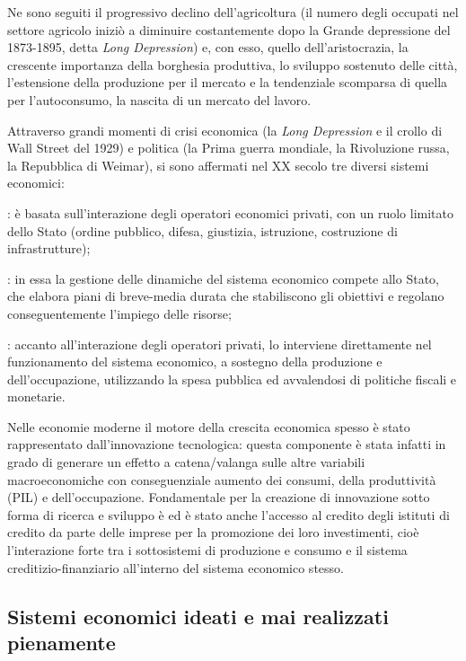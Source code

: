 Ne sono seguiti il progressivo declino dell'agricoltura (il numero degli 
occupati nel settore agricolo iniziò a diminuire costantemente dopo la Grande 
depressione del 1873-1895, detta \emph{Long Depression}) e, con esso, quello 
dell'aristocrazia, la crescente importanza della borghesia produttiva, lo 
sviluppo sostenuto delle città, l'estensione della produzione per il mercato e 
la tendenziale scomparsa di quella per l'autoconsumo, la nascita di un mercato 
del lavoro.

Attraverso grandi momenti di crisi economica (la \emph{Long Depression} e il 
crollo di Wall Street del 1929) e politica (la 
Prima guerra mondiale, la Rivoluzione russa, la Repubblica di 
Weimar), si sono affermati nel XX secolo tre diversi sistemi economici:
\begin{description} [noitemsep]
\item [l'economia di mercato]: è basata sull'interazione degli operatori 
economici privati, con un ruolo limitato dello Stato (ordine pubblico, 
difesa, giustizia, istruzione, costruzione di infrastrutture);
\item [l'economia pianificata]: in essa la gestione delle dinamiche del sistema 
economico compete allo Stato, che elabora piani di breve-media durata che 
stabiliscono gli obiettivi e regolano conseguentemente l'impiego delle risorse;
\item [l'economia mista]: accanto all'interazione degli operatori privati, lo 
interviene direttamente nel funzionamento del sistema economico, a sostegno 
della produzione e dell'occupazione, utilizzando la spesa pubblica ed 
avvalendosi di politiche fiscali e monetarie.
\end{description}

Nelle economie moderne il motore della crescita economica spesso è stato 
rappresentato dall'innovazione tecnologica: questa componente è stata infatti in 
grado di generare un effetto a catena/valanga sulle altre variabili 
macroeconomiche con conseguenziale aumento dei consumi, della produttività (PIL) 
e dell'occupazione. 
Fondamentale per la creazione di innovazione sotto forma di ricerca e 
sviluppo è ed è stato anche l'accesso al credito degli istituti di 
credito da parte delle imprese per la promozione dei loro 
investimenti, cioè l'interazione forte tra i sottosistemi di 
produzione e consumo e il sistema creditizio-finanziario all'interno del 
sistema economico stesso.

\subsection{Sistemi economici ideati e mai realizzati pienamente}

